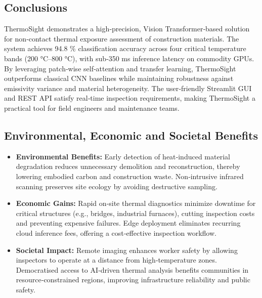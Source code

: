 \subsection{Conclusions}
ThermoSight demonstrates a high‐precision, Vision Transformer‐based solution for non‐contact thermal exposure assessment of construction materials. The system achieves 94.8 \% classification accuracy across four critical temperature bands (200 °C–800 °C), with sub‐350 ms inference latency on commodity GPUs. By leveraging patch‐wise self‐attention and transfer learning, ThermoSight outperforms classical CNN baselines while maintaining robustness against emissivity variance and material heterogeneity. The user‐friendly Streamlit GUI and REST API satisfy real‐time inspection requirements, making ThermoSight a practical tool for field engineers and maintenance teams.

\subsection{Environmental, Economic and Societal Benefits}
\begin{itemize}
    \item \textbf{Environmental Benefits:}  
    Early detection of heat‐induced material degradation reduces unnecessary demolition and reconstruction, thereby lowering embodied carbon and construction waste. Non‐intrusive infrared scanning preserves site ecology by avoiding destructive sampling.  
    \item \textbf{Economic Gains:}  
    Rapid on‐site thermal diagnostics minimize downtime for critical structures (e.g., bridges, industrial furnaces), cutting inspection costs and preventing expensive failures. Edge deployment eliminates recurring cloud inference fees, offering a cost‐effective inspection workflow.  
    \item \textbf{Societal Impact:}  
    Remote imaging enhances worker safety by allowing inspectors to operate at a distance from high‐temperature zones. Democratised access to AI‐driven thermal analysis benefits communities in resource‐constrained regions, improving infrastructure reliability and public safety.
\end{itemize}

